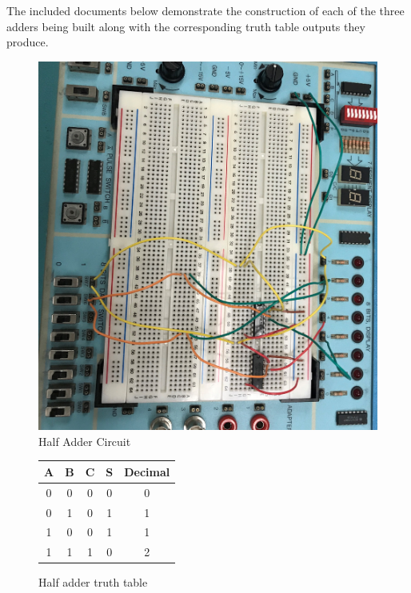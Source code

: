 \documentclass[11pt]{article}
\begin{document}
The included documents below demonstrate the construction of each of the three adders being built along with the corresponding truth table outputs they produce. 

\begin{figure}
	\includegraphics [width=1.0\textwidth]{"HALFADDER"}
	\caption{Half Adder Circuit}

\end{figure}
\begin{figure}[ht]\centering
	\begin{tabular}{c|c||c|c||c}
		\toprule
		A & B & C & S & Decimal \\
		\midrule
		0 & 0 & 0 & 0 & 0 \\
		0 & 1 & 0 & 1 & 1 \\
		1 & 0 & 0 & 1 & 1 \\
		1 & 1 & 1 & 0 & 2 \\
		\bottomrule
	\end{tabular} 
	
	\caption{Half adder truth table}
	
\end{figure}
\end{document}
